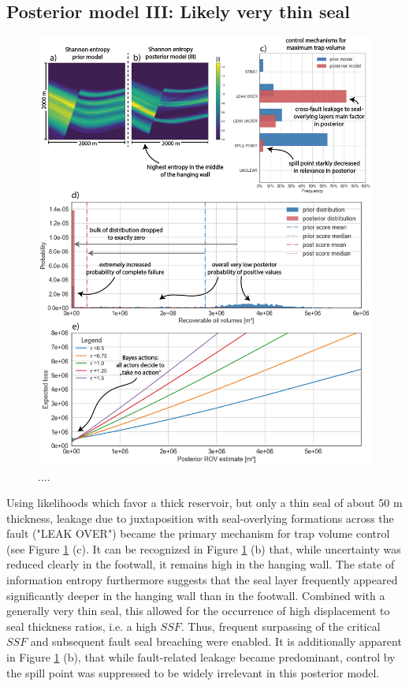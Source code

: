 		\subsection{Posterior model III: Likely very thin seal}%
		\begin{figure}[p!]
			\centering
			\includegraphics[width=1\textwidth]{Figures/ML2}
			\caption{....}\label{fig:ML2}
		\end{figure}
		Using likelihoods which favor a thick reservoir, but only a thin seal of about 50 m thickness, leakage due to juxtaposition with seal-overlying formations across the fault ("LEAK OVER") became the primary mechanism for trap volume control (see Figure \ref{fig:ML2} (c). It can be recognized in Figure \ref{fig:ML2} (b) that, while uncertainty was reduced clearly in the footwall, it remains high in the hanging wall. The state of information entropy furthermore suggests that the seal layer frequently appeared significantly deeper in the hanging wall than in the footwall. Combined with a generally very thin seal, this allowed for the occurrence of high displacement to seal thickness ratios, i.e. a high $SSF$. Thus, frequent surpassing of the critical $SSF$ and subsequent fault seal breaching were enabled. It is additionally apparent in Figure \ref{fig:ML2} (b), that while fault-related leakage became predominant, control by the spill point was suppressed to be widely irrelevant in this posterior model.\\	%
